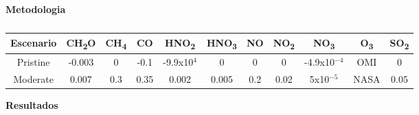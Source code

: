 \documentclass{article}
\begin{document}
\begin{center}
\begin{shaded}
\textbf{\textcolor{ver}{Metodologia}}
\end{shaded}
\end{center}
\begin{table}[H]
    \centering
    \begin{tabular}{ccccccccccc} 
         Escenario & CH\textsubscript{2}O & CH\textsubscript{4}& CO & HNO\textsubscript{2} & HNO\textsubscript{3} & NO & NO\textsubscript{2} & NO\textsubscript{3} & O\textsubscript{3} & SO\textsubscript{2}\\ \hline
       Pristine &-0.003 & 0  &-0.1  &-9.9x10$^{4}$& 0  &      0&    0  &    -4.9x10$^{-4}$  & OMI & 0 \\ \cline{1-9} \cline{11-11}
       Moderate & 0.007 & 0.3& 0.35    &   0.002  &  0.005 & 0.2 & 0.02 & 5x10$^{-5}$ & NASA &0.05 \\ \hline
    \end{tabular}
    \caption{}
\end{table}
\begin{center}
\begin{shaded}
\textbf{\textcolor{ver}{Resultados}}
\end{shaded}
\end{center}
\end{document}
